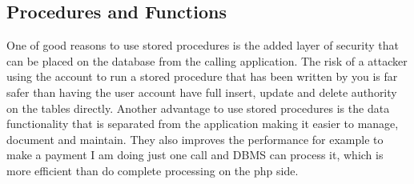     \subsection{Procedures and Functions}
One of good reasons to use stored procedures is the added layer of security that can be placed on the database from the calling application. The risk of a attacker using the account to run a stored procedure that has been written by you is far safer than having the user account have full insert, update and delete authority on the tables directly. Another advantage to use stored procedures is the data functionality that is separated from the application making it easier to manage, document and maintain. They also improves the performance for example to make a payment I am doing just one call and DBMS can process it, which is more efficient than do complete processing on the php side.
\\

